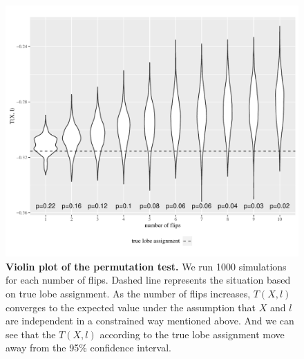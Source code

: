 \documentclass[10pt,letterpaper]{article}
\begin{document}
\begin{figure}[!htbp]
\centering
\includegraphics[width=1\textwidth]{violinplot_new_flip_2norm_1_8.pdf}
\caption{{\bf Violin plot of the permutation test.}
We run 1000 simulations for each number of flips. Dashed line represents the situation based on true lobe assignment. As the number of flips increases, $T(X, l)$ converges to the expected value under the assumption that $X$ and $l$ are independent in a constrained way mentioned above. And we can see that the $T(X, l)$ according to the true lobe assignment move away from the 95\% confidence interval.}
\label{fig:violin_plot}
\end{figure}

\end{document}
